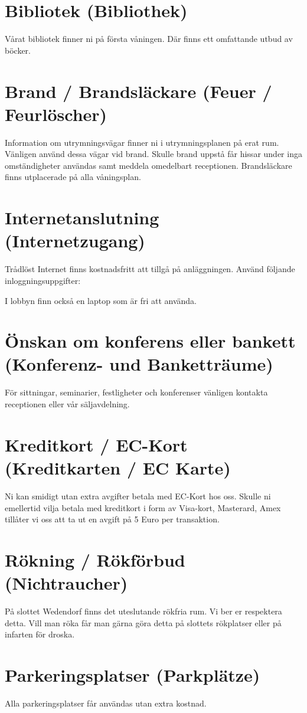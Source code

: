 \documentclass{report}
\begin{document}
\section{Bibliotek (Bibliothek)}
Vårat bibliotek finner ni på första våningen. Där finns ett omfattande utbud av böcker.

\section{Brand / Brandsläckare (Feuer / Feurlöscher)}
Information om utrymningsvägar finner ni i utrymningsplanen på erat rum. Vänligen använd dessa vägar vid brand.
Skulle brand uppstå får hissar under inga omständigheter användas samt meddela omedelbart receptionen.
Brandsläckare finns utplacerade på alla våningsplan.

\section{Internetanslutning (Internetzugang)}
Trådlöst Internet finns kostnadsfritt att tillgå på anläggningen. Använd följande inloggningsuppgifter:

I lobbyn finn också en laptop som är fri att använda.

\section{Önskan om konferens eller bankett (Konferenz- und Banketträume)}
För sittningar, seminarier, festligheter och konferenser vänligen kontakta receptionen eller vår säljavdelning.

\section{Kreditkort / EC-Kort (Kreditkarten / EC Karte)}
Ni kan smidigt utan extra avgifter betala med EC-Kort hos oss. Skulle ni emellertid vilja betala med kreditkort
i form av Visa-kort, Masterard, Amex tillåter vi oss att ta ut en avgift på 5 Euro per transaktion.

\section{Rökning / Rökförbud (Nichtraucher)}
På slottet Wedendorf finns det uteslutande rökfria rum. Vi ber er respektera detta. Vill man röka får man gärna
göra detta på slottets rökplatser eller på infarten för droska.

\section{Parkeringsplatser (Parkplätze)}
Alla parkeringsplatser får användas utan extra kostnad.
\end{document}
